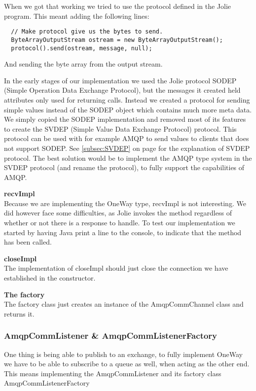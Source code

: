 When we got that working we tried to use the protocol defined in the Jolie program. This meant adding the following lines:
\begin{lstlisting}
  // Make protocol give us the bytes to send.
  ByteArrayOutputStream ostream = new ByteArrayOutputStream();
  protocol().send(ostream, message, null);
\end{lstlisting}
And sending the byte array from the output stream.

In the early stages of our implementation we used the Jolie protocol SODEP (Simple Operation Data Exchange Protocol)\cite{SODEP}, but the messages it created held attributes only used for returning calls. Instead we created a protocol for sending simple values instead of the SODEP object which contains much more meta data. We simply copied the SODEP implementation and removed most of its features to create the SVDEP (Simple Value Data Exchange Protocol) protocol. This protocol can be used with for example AMQP to send values to clients that does not support SODEP. See \ref{subsec:SVDEP} on page \pageref{subsec:SVDEP} for the explanation of SVDEP protocol. The best solution would be to implement the AMQP type system in the SVDEP protocol (and rename the protocol), to fully support the capabilities of AMQP.

\noindent\textbf{recvImpl}\\
Because we are implementing the OneWay type, recvImpl is not interesting. We did however face some difficulties, as Jolie invokes the method regardless of whether or not there is a response to handle. To test our implementation we started by having Java print a line to the console, to indicate that the method has been called.

\noindent\textbf{closeImpl}\\
The implementation of closeImpl should just close the connection we have established in the constructor.

\noindent\textbf{The factory}\\
The factory class just creates an instance of the AmqpCommChannel class and returns it.

\subsubsection{AmqpCommListener \& AmqpCommListenerFactory}
One thing is being able to publish to an exchange, to fully implement OneWay we have to be able to subscribe to a queue as well, when acting as the other end. This means implementing the AmqpCommListener and its factory class AmqpCommListenerFactory

